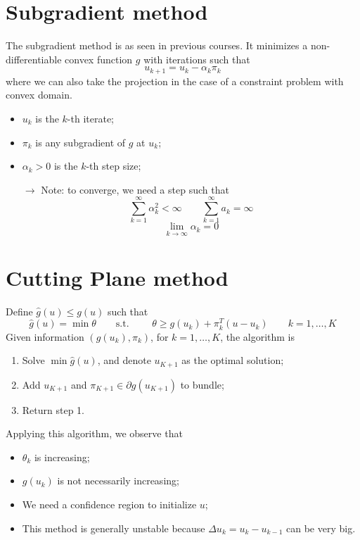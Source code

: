 \documentclass[12pt, openany]{report}
\theoremstyle{definition}
\begin{document}
\section{Subgradient method}
The subgradient method is as seen in previous courses. It minimizes a non-differentiable convex function $g$ with iterations such that 
\begin{equation}
	u_{k+1} = u_k - \alpha_k \pi_k
\end{equation}
where we can also take the projection in the case of a constraint problem with convex domain. 
\begin{itemize}
	\item $u_k$ is the $k$-th iterate;
	\item $\pi_k$ is any subgradient of $g$ at $u_k$;
	\item $\alpha_k>0$ is the $k$-th step size;
	\item [$\to$] Note: to converge, we need a step such that 
	\begin{equation}
		\sum_{k=1}^\infty \alpha_k^2 < \infty \qquad \sum_{k=1}^\infty a_k = \infty 
	\end{equation}
	\begin{equation}
		\lim_{k\to \infty} \alpha_k = 0
	\end{equation}
\end{itemize}
\section{Cutting Plane method}
Define $\hat g(u)\le g(u)$ such that 
\begin{equation}
	\hat g(u) = \min \theta \qquad \text{s.t. } \qquad \theta\ge g(u_k) + \pi_k^T (u-u_k) \qquad k=1,\dots,K
\end{equation}
Given information $(g(u_k),\pi_k)$, for $k=1,\dots,K$, the algorithm is 
\begin{enumerate}
	\item Solve $\min \hat g(u)$, and denote $u_{K+1}$ as the optimal solution;
	\item Add $u_{K+1}$ and $\pi_{K+1}\in \partial g(u_{K+1})$ to bundle;
	\item Return step 1.
\end{enumerate}
Applying this algorithm, we observe that 
\begin{itemize}
	\item $\theta_k$ is increasing;
	\item $g(u_k)$ is not necessarily increasing;
	\item We need a confidence region to initialize $u$;
	\item This method is generally unstable because $\Delta u_k=u_k-u_{k-1}$ can be very big.
\end{itemize}
\end{document}
